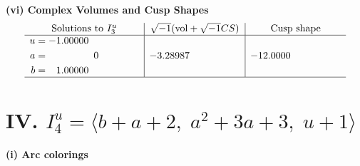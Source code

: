 \documentclass[1p]{elsarticle_modified}
\theoremstyle{definition}
\newcommand{\I}{\sqrt{-1}}
\begin{document}
\newpage\flushleft \textbf{(vi) Complex Volumes and Cusp Shapes}
$$\begin{array}{c|c|c}  
\text{Solutions to }I^u_{3}& \I (\text{vol} + \sqrt{-1}CS) & \text{Cusp shape}\\
 \hline 
\begin{aligned}
u &= -1.00000\phantom{ +0.000000I} \\
a &= \phantom{-0.000000 } 0 \\
b &= \phantom{-}1.00000\phantom{ +0.000000I}\end{aligned}
 & -3.28987\phantom{ +0.000000I} & -12.0000\phantom{ +0.000000I}\\
 \hline 
 \end{array}$$\newpage\newpage\renewcommand{\arraystretch}{1}
\centering \section*{IV. $I^u_{4}= \langle b+a+2,\;a^2+3 a+3,\;u+1 \rangle$}
\flushleft \textbf{(i) Arc colorings}\\
\end{document}
